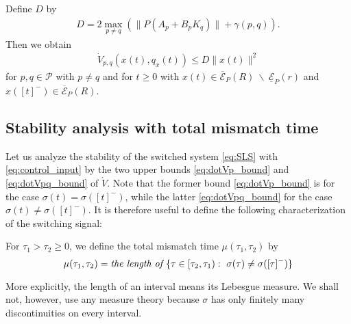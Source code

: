 \documentclass[a4, 11pt]{article}
\begin{document}
Define $D$ by
\begin{align}
D = 
2\max_{p \not= q} 
(\|P(A_p + B_pK_q) \| + \gamma(p,q)).
\label{eq:D_def}
\end{align}
Then we obtain
\begin{align}
\label{eq:dotVpq_bound}
\dot V_{p,q}(x(t),q_x(t)) \leq D \|x(t)\|^2
\end{align}
for $p,q \in \mathcal{P}$ with $p \not= q$ and
for $t \geq 0$ with
$x(t)\in
\overline{\mathcal{E}}_P(R)~\backslash~\underline{\mathcal{E}}_P(r)$
and $x([t]^-) \in
\overline{\mathcal{E}}_P(R)$.





\subsection{Stability analysis with total mismatch time}
Let us analyze the stability of 
the switched system \eqref{eq:SLS} with \eqref{eq:control_input} by the two
upper bounds \eqref{eq:dotVp_bound} and 
\eqref{eq:dotVpq_bound} of $\dot V$.
Note that
the former bound \eqref{eq:dotVp_bound} 
is for the case $\sigma(t)=\sigma([t]^-)$, while
the latter \eqref{eq:dotVpq_bound} for the case $\sigma(t)\not=\sigma([t]^-)$.
It is therefore useful to define the following characterization of the 
switching signal:
\begin{definition}
For $\tau_1 > \tau_2 \geq 0$, 
we define the total mismatch time $\mu(\tau_1,\tau_2)$ by
\begin{equation}
\label{eq:mu_def_same}
\mu(\tau_1, \tau_2) = \text{{\em the length
of~}} \{\tau \in [\tau_2,\tau_1):~ \sigma(\tau) \not = \sigma([\tau]^-)\}
\end{equation}
\end{definition}
More explicitly, 
the length of an interval means its Lebesgue measure.
We shall not, however, use any measure theory because
$\sigma$ has only finitely many discontinuities
on every interval.
\end{document}
